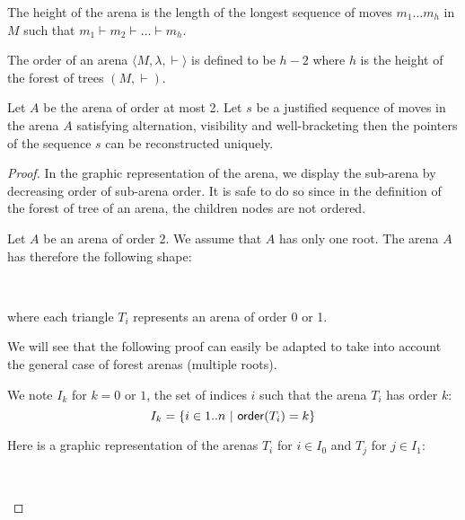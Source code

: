 The height of the arena is the length of the longest sequence of moves
$m_1 \ldots m_h$ in $M$ such that $m_1 \vdash m_2 \vdash \ldots \vdash m_h$.

The order of an arena $\langle M, \lambda, \vdash \rangle$ is defined to be
$h-2$ where $h$ is the height of the forest of trees $(M, \vdash)$.


\begin{lem}
Let $A$ be the arena of order at most 2. Let $s$ be a justified sequence of moves in the arena $A$ satisfying
 alternation, visibility and well-bracketing then
the pointers of the sequence $s$ can be reconstructed uniquely.
\end{lem}



\begin{proof}
In the graphic representation of the arena, we display the sub-arena by decreasing order of sub-arena order.
It is safe to do so since in the definition of the forest of tree of an arena, the children nodes
are not ordered.

Let $A$ be an arena of order 2. We assume that $A$ has only one root. The arena $A$ has therefore the following shape:
\begin{center}
\
    {
 \SubTree[linestyle=none]{$\ldots$} 
    \TR{$a_1$} \TR{$a_2$} \TR{\ldots} }
\end{center}

where each triangle $T_i$ represents an arena of order 0 or 1.

We will see that the following proof can easily be adapted to take into account the general case of forest arenas (multiple roots).

We note $I_k$ for $k=0$ or $1$, the set of indices $i$ such that the arena $T_i$ has order $k$:
$$I_k = \{ i \in 1.. n\ |\ {\sf order}(T_i) = k \}$$

Here is a graphic representation of the arenas $T_i$ for $i \in I_0$ and $T_j$ for $j \in I_1$:
\begin{center}
\
    {   \TR{\ldots} }
\hspace{2cm}
    {
        {   \TR{\ldots} }
      \TR{$b_1^j$}  \TR{\ldots}
    }
\end{center}




\end{proof}



